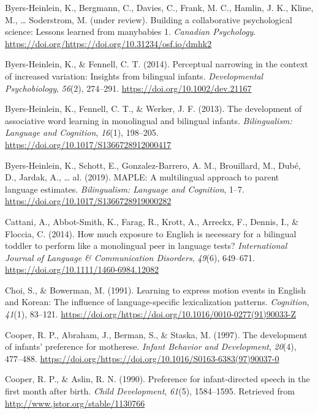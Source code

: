 \documentclass[,man,floatsintext]{apa6}
\begin{document}
\leavevmode\hypertarget{ref-byers_heinlein_et_al_2019}{}%
Byers-Heinlein, K., Bergmann, C., Davies, C., Frank, M. C., Hamlin, J. K., Kline, M., \ldots{} Soderstrom, M. (under review). Building a collaborative psychological science: Lessons learned from manybabies 1. \emph{Canadian Psychology}. \url{https://doi.org/https://doi.org/10.31234/osf.io/dmhk2}

\leavevmode\hypertarget{ref-byers_heinlein_2014}{}%
Byers-Heinlein, K., \& Fennell, C. T. (2014). Perceptual narrowing in the context of increased variation: Insights from bilingual infants. \emph{Developmental Psychobiology}, \emph{56}(2), 274--291. \url{https://doi.org/10.1002/dev.21167}

\leavevmode\hypertarget{ref-byers_heinlein_2013}{}%
Byers-Heinlein, K., Fennell, C. T., \& Werker, J. F. (2013). The development of associative word learning in monolingual and bilingual infants. \emph{Bilingualism: Language and Cognition}, \emph{16}(1), 198--205. \url{https://doi.org/10.1017/S1366728912000417}

\leavevmode\hypertarget{ref-byers_heinlein_2019}{}%
Byers-Heinlein, K., Schott, E., Gonzalez-Barrero, A. M., Brouillard, M., Dubé, D., Jardak, A., \ldots{} al. (2019). MAPLE: A multilingual approach to parent language estimates. \emph{Bilingualism: Language and Cognition}, 1--7. \url{https://doi.org/10.1017/S1366728919000282}

\leavevmode\hypertarget{ref-cattani_2014}{}%
Cattani, A., Abbot-Smith, K., Farag, R., Krott, A., Arreckx, F., Dennis, I., \& Floccia, C. (2014). How much exposure to English is necessary for a bilingual toddler to perform like a monolingual peer in language tests? \emph{International Journal of Language \& Communication Disorders}, \emph{49}(6), 649--671. \url{https://doi.org/10.1111/1460-6984.12082}

\leavevmode\hypertarget{ref-choi_1991}{}%
Choi, S., \& Bowerman, M. (1991). Learning to express motion events in English and Korean: The influence of language-specific lexicalization patterns. \emph{Cognition}, \emph{41}(1), 83--121. \url{https://doi.org/https://doi.org/10.1016/0010-0277(91)90033-Z}

\leavevmode\hypertarget{ref-cooper_1997}{}%
Cooper, R. P., Abraham, J., Berman, S., \& Staska, M. (1997). The development of infants' preference for motherese. \emph{Infant Behavior and Development}, \emph{20}(4), 477--488. \url{https://doi.org/https://doi.org/10.1016/S0163-6383(97)90037-0}

\leavevmode\hypertarget{ref-cooper_1990}{}%
Cooper, R. P., \& Aslin, R. N. (1990). Preference for infant-directed speech in the first month after birth. \emph{Child Development}, \emph{61}(5), 1584--1595. Retrieved from \url{http://www.jstor.org/stable/1130766}
\end{document}
